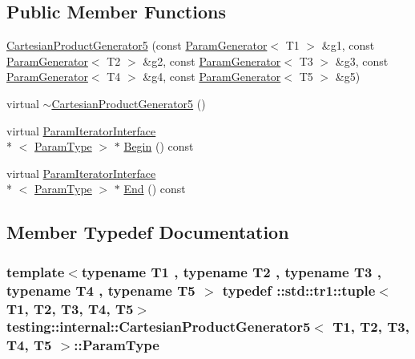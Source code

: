 \subsection*{Public Member Functions}
\begin{DoxyCompactItemize}
\item 
\hyperlink{classtesting_1_1internal_1_1CartesianProductGenerator5_ab25fd0df9d6325f10f218c3b7553820d}{Cartesian\-Product\-Generator5} (const \hyperlink{classtesting_1_1internal_1_1ParamGenerator}{Param\-Generator}$<$ T1 $>$ \&g1, const \hyperlink{classtesting_1_1internal_1_1ParamGenerator}{Param\-Generator}$<$ T2 $>$ \&g2, const \hyperlink{classtesting_1_1internal_1_1ParamGenerator}{Param\-Generator}$<$ T3 $>$ \&g3, const \hyperlink{classtesting_1_1internal_1_1ParamGenerator}{Param\-Generator}$<$ T4 $>$ \&g4, const \hyperlink{classtesting_1_1internal_1_1ParamGenerator}{Param\-Generator}$<$ T5 $>$ \&g5)
\item 
virtual \hyperlink{classtesting_1_1internal_1_1CartesianProductGenerator5_a4f3e6916df2cdff0cb2873a8767d001e}{$\sim$\-Cartesian\-Product\-Generator5} ()
\item 
virtual \hyperlink{classtesting_1_1internal_1_1ParamIteratorInterface}{Param\-Iterator\-Interface}\\*
$<$ \hyperlink{classtesting_1_1internal_1_1CartesianProductGenerator5_a081ee8effde35f8caa9ec79cf9c29cbd}{Param\-Type} $>$ $\ast$ \hyperlink{classtesting_1_1internal_1_1CartesianProductGenerator5_acc7e400a1a5d5d6eb79f9aa1ae45a7ce}{Begin} () const 
\item 
virtual \hyperlink{classtesting_1_1internal_1_1ParamIteratorInterface}{Param\-Iterator\-Interface}\\*
$<$ \hyperlink{classtesting_1_1internal_1_1CartesianProductGenerator5_a081ee8effde35f8caa9ec79cf9c29cbd}{Param\-Type} $>$ $\ast$ \hyperlink{classtesting_1_1internal_1_1CartesianProductGenerator5_a8603bd7755d52d89f6e12744b46a9333}{End} () const 
\end{DoxyCompactItemize}


\subsection{Member Typedef Documentation}
\hypertarget{classtesting_1_1internal_1_1CartesianProductGenerator5_a081ee8effde35f8caa9ec79cf9c29cbd}{
\subsubsection[{Param\-Type}]{\setlength{\rightskip}{0pt plus 5cm}template$<$typename T1 , typename T2 , typename T3 , typename T4 , typename T5 $>$ typedef \-::{\bf std\-::tr1\-::tuple}$<$T1, T2, T3, T4, T5$>$ {\bf testing\-::internal\-::\-Cartesian\-Product\-Generator5}$<$ T1, T2, T3, T4, T5 $>$\-::{\bf Param\-Type}}}\label{classtesting_1_1internal_1_1CartesianProductGenerator5_a081ee8effde35f8caa9ec79cf9c29cbd}


